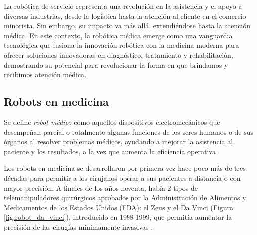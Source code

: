  
   

La robótica de servicio representa una revolución en la asistencia y el apoyo a diversas industrias, desde la logística hasta la atención al cliente en el comercio minorista. Sin embargo, su impacto va más allá, extendiéndose hasta la atención médica. En este contexto, la robótica médica emerge como una vanguardia tecnológica que fusiona la innovación robótica con la medicina moderna para ofrecer soluciones innovadoras en diagnóstico, tratamiento y rehabilitación, demostrando su potencial para revolucionar la forma en que brindamos y recibimos atención médica.
 
\subsection{Robots en medicina}
\label{sec:robots_medicina} 

Se define \textit{robot médico} como aquellos dispositivos electromecánicos que desempeñan parcial o totalmente algunas funciones de los seres humanos o de sus órganos al resolver problemas médicos, ayudando a mejorar la asistencia al paciente y los resultados, a la vez que aumenta la eficiencia operativa \cite{Kraevsky10}.

Los robots en medicina se desarrollaron por primera vez hace poco más de tres décadas para permitir a los cirujanos operar a sus pacientes a distancia o con mayor precisión. A finales de los años noventa, había 2 tipos de telemanipuladores quirúrgicos aprobados por la Administración de Alimentos y Medicamentos de los Estados Unidos (FDA): el Zeus y el Da Vinci (Figura \ref{fig:robot_da_vinci}), introducido en 1998-1999, que permitía aumentar la precisión de las cirugías mínimamente invasivas \cite{Romero20}.

